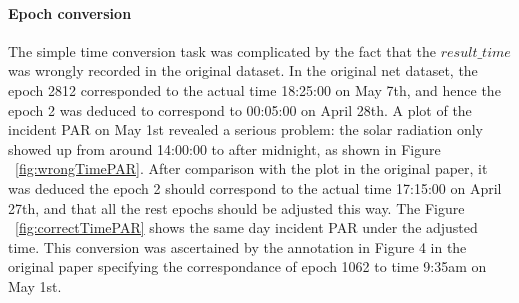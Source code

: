 \documentclass[11pt]{article}
\begin{document}
\paragraph{Epoch conversion}
The simple time conversion task was complicated by the fact that the $result\_time$ was wrongly recorded in the original dataset. In the original net dataset, the epoch 2812 corresponded to the actual time 18:25:00 on May 7th, and hence the epoch 2 was deduced to correspond to 00:05:00 on April 28th. A plot of the incident PAR on May 1st revealed a serious problem: the solar radiation only showed up from around 14:00:00 to after midnight, as shown in Figure ~\ref{fig:wrongTimePAR}. After comparison with the plot in the original paper, it was deduced the epoch 2 should correspond to the actual time 17:15:00 on April 27th, and that all the rest epochs should be adjusted this way. The Figure ~\ref{fig:correctTimePAR} shows the same day incident PAR under the adjusted time. This conversion was ascertained by the annotation in Figure 4 in the original paper specifying the correspondance of epoch 1062 to time 9:35am on May 1st.
\end{document}
